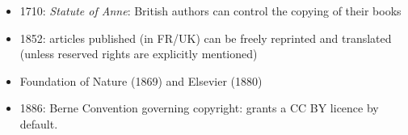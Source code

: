 \documentclass[10pt,compress,serif]{beamer}
\begin{document}
\begin{frame}[t]%
 \vskip1cm%
\begin{itemize}

 \item 1710: \textit{Statute of Anne}: British authors can control the copying of their books 
 \item 1852: articles published (in FR/UK) can be freely reprinted and translated (unless reserved rights are explicitly mentioned)
 \item Foundation of Nature (1869) and Elsevier (1880)
 \item 1886: Berne Convention governing copyright: grants a CC BY licence by default.%


\end{itemize}
\end{frame}
\end{document}

